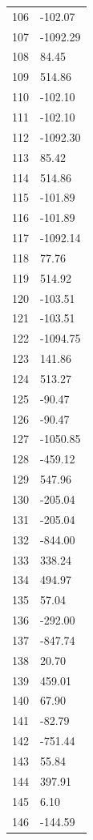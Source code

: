 \documentclass[a4paper,11pt]{article}
\begin{document}
\begin{center}
\begin{longtable}{|R{1.5cm}|R{2.5cm}|}
  106 &      -102.07 \\
  107 &     -1092.29 \\
  108 &        84.45 \\
  109 &       514.86 \\
  110 &      -102.10 \\
  111 &      -102.10 \\
  112 &     -1092.30 \\
  113 &        85.42 \\
  114 &       514.86 \\
  115 &      -101.89 \\
  116 &      -101.89 \\
  117 &     -1092.14 \\
  118 &        77.76 \\
  119 &       514.92 \\
  120 &      -103.51 \\
  121 &      -103.51 \\
  122 &     -1094.75 \\
  123 &       141.86 \\
  124 &       513.27 \\
  125 &       -90.47 \\
  126 &       -90.47 \\
  127 &     -1050.85 \\
  128 &      -459.12 \\
  129 &       547.96 \\
  130 &      -205.04 \\
  131 &      -205.04 \\
  132 &      -844.00 \\
  133 &       338.24 \\
  134 &       494.97 \\
  135 &        57.04 \\
  136 &      -292.00 \\
  137 &      -847.74 \\
  138 &        20.70 \\
  139 &       459.01 \\
  140 &        67.90 \\
  141 &       -82.79 \\
  142 &      -751.44 \\
  143 &        55.84 \\
  144 &       397.91 \\
  145 &         6.10 \\
  146 &      -144.59 \\

\end{longtable}
\end{center}
\end{document}
